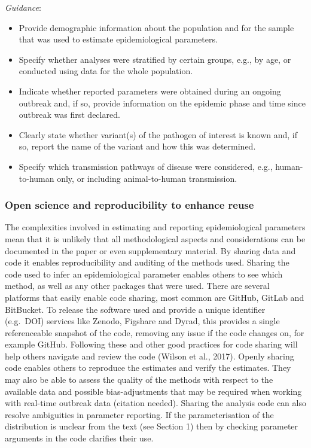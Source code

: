 \documentclass[
  10pt,
  letterpaper,
]{article}
\providecommand{\tightlist}{%
  \setlength{\itemsep}{0pt}\setlength{\parskip}{0pt}}\usepackage{longtable,booktabs,array}
\begin{document}
\emph{Guidance}:

\begin{itemize}
\tightlist
\item
  Provide demographic information about the population and for the
  sample that was used to estimate epidemiological parameters.
\item
  Specify whether analyses were stratified by certain groups, e.g., by
  age, or conducted using data for the whole population.
\item
  Indicate whether reported parameters were obtained during an ongoing
  outbreak and, if so, provide information on the epidemic phase and
  time since outbreak was first declared.
\item
  Clearly state whether variant(s) of the pathogen of interest is known
  and, if so, report the name of the variant and how this was
  determined.
\item
  Specify which transmission pathways of disease were considered, e.g.,
  human-to-human only, or including animal-to-human transmission.
\end{itemize}

\subsubsection{Open science and reproducibility to enhance
reuse}\label{open-science-and-reproducibility-to-enhance-reuse}

The complexities involved in estimating and reporting epidemiological
parameters mean that it is unlikely that all methodological aspects and
considerations can be documented in the paper or even supplementary
material. By sharing data and code it enables reproducibility and
auditing of the methods used. Sharing the code used to infer an
epidemiological parameter enables others to see which method, as well as
any other packages that were used. There are several platforms that
easily enable code sharing, most common are GitHub, GitLab and
BitBucket. To release the software used and provide a unique identifier
(e.g.~DOI) services like Zenodo, Figshare and Dyrad, this provides a
single referenceable snapshot of the code, removing any issue if the
code changes on, for example GitHub. Following these and other good
practices for code sharing will help others navigate and review the code
(Wilson et al., 2017). Openly sharing code enables others to reproduce
the estimates and verify the estimates. They may also be able to assess
the quality of the methods with respect to the available data and
possible bias-adjustments that may be required when working with
real-time outbreak data (citation needed). Sharing the analysis code can
also resolve ambiguities in parameter reporting. If the parameterisation
of the distribution is unclear from the text (see Section 1) then by
checking parameter arguments in the code clarifies their use.
\end{document}
